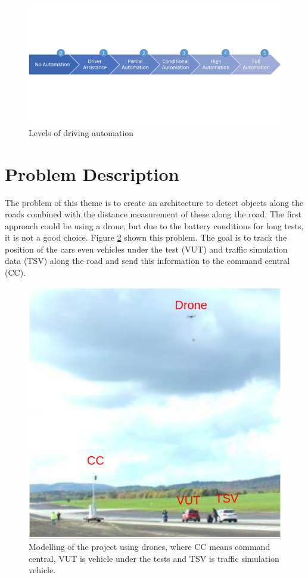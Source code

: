\begin{figure}[H]
\centering
\includegraphics[scale=0.55]{imagens/diagrama_levels.png}
\caption{Levels of driving automation}
\label{fig:automation}
\end{figure}

\section{Problem Description}

The problem of this theme is to create an architecture to detect objects along the roads combined with the distance measurement of these along the road. The first approach could be using a drone, but due to the battery conditions for long tests, it is not a good choice. Figure \ref{fig:tests} shown this problem. The goal is to track the position of the cars even vehicles under the test (VUT) and traffic simulation data (TSV) along the road and send this information to the command central (CC). 

\begin{figure}[H]
\centering
\includegraphics[scale=0.6]{imagens/proposal.png}
\caption{Modelling of the project using drones, where CC means command central, VUT is vehicle under the tests and TSV is traffic simulation vehicle.}
\label{fig:tests}
\end{figure}

